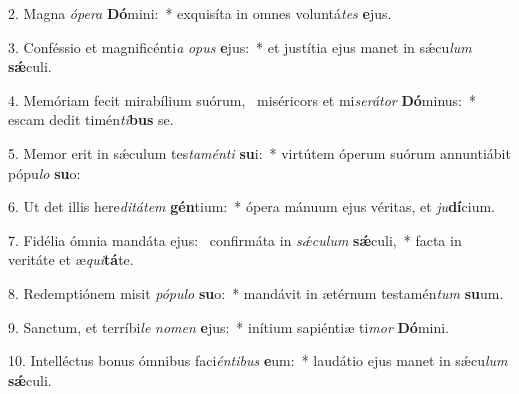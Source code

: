 2. Magna \textit{ó}\textit{pe}\textit{ra} \textbf{Dó}mini:~*  exquisíta in omnes voluntá\textit{tes} \textbf{e}jus.\

3. Conféssio et magnificénti\textit{a} \textit{o}\textit{pus} \textbf{e}jus:~*  et justítia ejus manet in sǽcu\textit{lum} \textbf{sǽ}culi.\

4. Memóriam fecit mirabílium suórum, \dag\  miséricors et mi\textit{se}\textit{rá}\textit{tor} \textbf{Dó}minus:~*  escam dedit timén\textit{ti}\textbf{bus} se.\

5. Memor erit in sǽculum tes\textit{ta}\textit{mén}\textit{ti} \textbf{su}i:~*  virtútem óperum suórum annuntiábit pópu\textit{lo} \textbf{su}o:\

6. Ut det illis here\textit{di}\textit{tá}\textit{tem} \textbf{gén}tium:~*  ópera mánuum ejus véritas, et \textit{ju}\textbf{dí}cium.\

7. Fidélia ómnia mandáta ejus: \dag\  confirmáta in \textit{sǽ}\textit{cu}\textit{lum} \textbf{sǽ}culi,~*  facta in veritáte et æ\textit{qui}\textbf{tá}te.\

8. Redemptiónem misit \textit{pó}\textit{pu}\textit{lo} \textbf{su}o:~*  mandávit in ætérnum testamén\textit{tum} \textbf{su}um.\

9. Sanctum, et terríbi\textit{le} \textit{no}\textit{men} \textbf{e}jus:~*  inítium sapiéntiæ ti\textit{mor} \textbf{Dó}mini.\

10. Intelléctus bonus ómnibus faci\textit{én}\textit{ti}\textit{bus} \textbf{e}um:~*  laudátio ejus manet in sǽcu\textit{lum} \textbf{sǽ}culi.\

